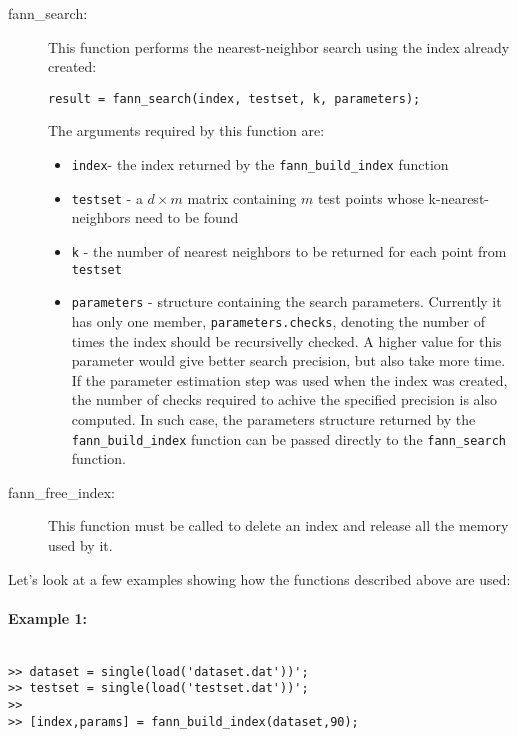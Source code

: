 \documentclass[letter,10pt]{article}
\begin{document}
\begin{description}
\item[fann\_search:] This function performs the nearest-neighbor search using the index already created:
\begin{Verbatim}
result = fann_search(index, testset, k, parameters);
\end{Verbatim}

The arguments required by this function are:
\begin{itemize}
 \item \texttt{index}- the index returned by the \texttt{fann\_build\_index} function
 \item \texttt{testset} - a $d \times m$ matrix containing $m$ test points whose k-nearest-neighbors need to be found
 \item \texttt{k} - the number of nearest neighbors to be returned for each point from \texttt{testset}
\item \texttt{parameters} - structure containing the search parameters. Currently it has only one member, \texttt{parameters.checks}, denoting the number of times the index should be recursivelly checked. A higher value for this parameter would give better search precision, but also take more time. If the parameter estimation step was used when the index was created, the number of checks required to achive the specified precision is also computed. In such case, the parameters structure returned by the \texttt{fann\_build\_index} function can be passed directly to the \texttt{fann\_search} function.
\end{itemize}


\item[fann\_free\_index:] This function must be called to delete an index and release all the memory used by it.


\end{description}

Let's look at a few examples showing how the functions described above are used:

\paragraph{Example 1:}

\begin{Verbatim}

>> dataset = single(load('dataset.dat'))';
>> testset = single(load('testset.dat'))';
>> 
>> [index,params] = fann_build_index(dataset,90); 

\end{Verbatim}




% 
% 
\end{document}
